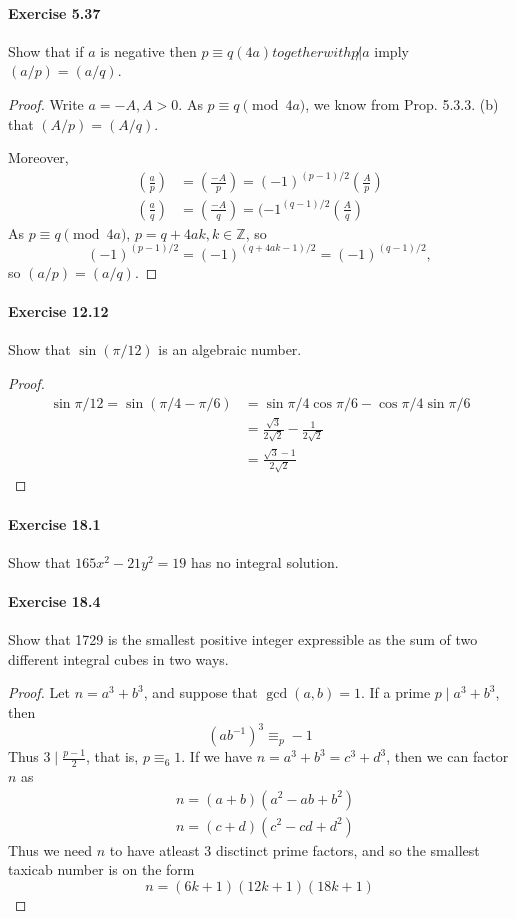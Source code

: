 \documentclass{article}
\begin{document}
\paragraph{Exercise 5.37} Show that if $a$ is negative then $p \equiv q(4 a) together with p\not | a$ imply $(a / p)=(a / q)$.
\begin{proof}    
\newcommand{\legendre}[2]{\genfrac{(}{)}{}{}{#1}{#2}}
Write $a = -A, A>0$. As $p \equiv q \pmod {4a}$, we know from Prop. 5.3.3. (b) that $(A/p) = (A/q)$.

Moreover,
\begin{align*}
\legendre{a}{p}&= \legendre{-A}{p} = (-1)^{(p-1)/2} \legendre{A}{p}\\
\legendre{a}{q}&= \legendre{-A}{q} = (-1^{(q-1)/2} \legendre{A}{q}
\end{align*}
As  $p \equiv q \pmod {4a}$, $ p = q + 4ak, k\in \mathbb{Z}$, so
$$(-1)^{(p-1)/2} = (-1)^{(q+4ak-1)/2} = (-1)^{(q-1)/2},$$
so $(a/p) = (a/q)$.
\end{proof}



\paragraph{Exercise 12.12} Show that $\sin (\pi / 12)$ is an algebraic number.
\begin{proof}
$$
\begin{aligned}
    \sin \pi/12=\sin \left(\pi/4-\pi/6\right) & =\sin \pi/4 \cos \pi/6-\cos \pi/4 \sin \pi/6 \\
& =\frac{\sqrt{3}}{2 \sqrt{2}}-\frac{1}{2 \sqrt{2}} \\
& =\frac{\sqrt{3}-1}{2 \sqrt{2}}
\end{aligned}
$$
\end{proof}




\paragraph{Exercise 18.1} Show that $165 x^{2}-21 y^{2}=19$ has no integral solution.


\paragraph{Exercise 18.4} Show that 1729 is the smallest positive integer expressible as the sum of two different integral cubes in two ways.
\begin{proof}
    Let $n=a^3+b^3$, and suppose that $\operatorname{gcd}(a, b)=1$. If a prime $p \mid a^3+b^3$, then
$$
\left(a b^{-1}\right)^3 \equiv_p-1
$$
Thus $3 \mid \frac{p-1}{2}$, that is, $p \equiv_6 1$.
If we have $n=a^3+b^3=c^3+d^3$, then we can factor $n$ as
$$
\begin{aligned}
& n=(a+b)\left(a^2-a b+b^2\right) \\
& n=(c+d)\left(c^2-c d+d^2\right)
\end{aligned}
$$
Thus we need $n$ to have atleast 3 disctinct prime factors, and so the smallest taxicab number is on the form
$$
n=(6 k+1)(12 k+1)(18 k+1)
$$
\end{proof}
\end{document}

